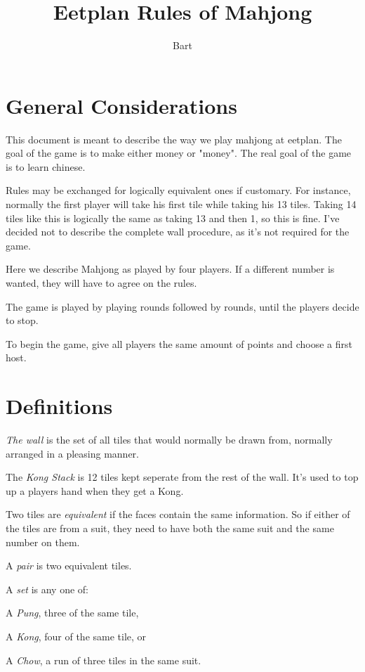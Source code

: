 \documentclass{article}
\begin{document}
\title{Eetplan Rules of Mahjong}
\author{Bart}
\maketitle

\section{General Considerations}
This document is meant to describe the way we play mahjong at eetplan. The goal of the game is to make either money or "money". The real goal of the game is to learn chinese.

Rules may be exchanged for logically equivalent ones if customary. For instance, normally the first player will take his first tile while taking his 13 tiles. Taking 14 tiles like this is logically the same as taking 13 and then 1, so this is fine. I've decided not to describe the complete wall procedure, as it's not required for the game.

Here we describe Mahjong as played by four players. If a different number is wanted, they will have to agree on the rules.

The game is played by playing rounds followed by rounds, until the players decide to stop.

To begin the game, give all players the same amount of points and choose a first host.

\section{Definitions}
\emph{The wall} is the set of all tiles that would normally be drawn from, normally arranged in a pleasing manner.

The \emph{Kong Stack} is 12 tiles kept seperate from the rest of the wall. It's used to top up a players hand when they get a Kong.

Two tiles are \emph{equivalent} if the faces contain the same information. So if either of the tiles are from a suit, they need to have both the same suit and the same number on them.

A \emph{pair} is two equivalent tiles.

A \emph{set} is any one of:
\begin{enumerate*}
    \item A \emph{Pung}, three of the same tile,
    \item A \emph{Kong}, four of the same tile, or
    \item A \emph{Chow}, a run of three tiles in the same suit.
\end{enumerate*}
\end{document}
